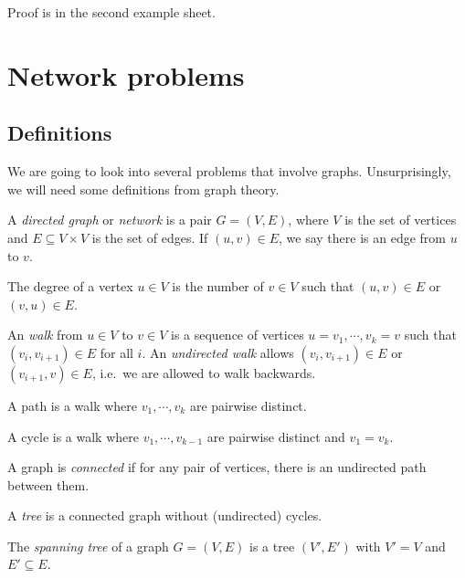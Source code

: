 \documentclass[a4paper]{article}
\begin{document}
Proof is in the second example sheet.

\section{Network problems}
\subsection{Definitions}
We are going to look into several problems that involve graphs. Unsurprisingly, we will need some definitions from graph theory.
\begin{defi}
  A \emph{directed graph} or \emph{network} is a pair $G = (V, E)$, where $V$ is the set of vertices and $E\subseteq V\times V$ is the set of edges. If $(u, v)\in E$, we say there is an edge from $u$ to $v$.
\end{defi}

\begin{defi}[Degree]
  The degree of a vertex $u \in V$ is the number of $v\in V$ such that $(u, v)\in E$ or $(v, u)\in E$.
\end{defi}

\begin{defi}[Walk]
  An \emph{walk} from $u\in V$ to $v\in V$ is a sequence of vertices $u = v_1, \cdots, v_k = v$ such that $(v_i, v_{i + 1})\in E$ for all $i$. An \emph{undirected walk} allows $(v_i, v_{i + 1})\in E$ or $(v_{i + 1}, v)\in E$, i.e.\ we are allowed to walk backwards.
\end{defi}

\begin{defi}[Path]
  A path is a walk where $v_1, \cdots, v_k$ are pairwise distinct.
\end{defi}

\begin{defi}[Cycle]
  A cycle is a walk where $v_1, \cdots, v_{k - 1}$ are pairwise distinct and $v_1 = v_k$.
\end{defi}

\begin{defi}
  A graph is \emph{connected} if for any pair of vertices, there is an undirected path between them.
\end{defi}

\begin{defi}[Tree]
  A \emph{tree} is a connected graph without (undirected) cycles.
\end{defi}

\begin{defi}
  The \emph{spanning tree} of a graph $G = (V, E)$ is a tree $(V', E')$ with $V' = V$ and $E'\subseteq E$.
\end{defi}
\end{document}
